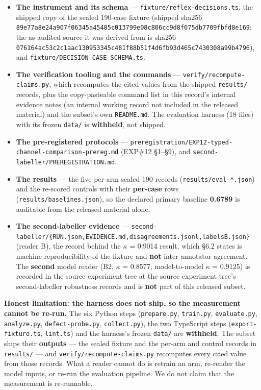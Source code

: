 \documentclass[11pt,a4paper]{article}
\begin{document}
\begin{itemize}
\item \textbf{The instrument and its schema} --- \texttt{fixture/reflex-decisions.ts}, the shipped copy of the sealed 190-case fixture (shipped sha256 \texttt{89e77a8e24a907f06345a45485c013799e08c806cc9d8f075db7709fbfd8e169}; the as-audited source it was derived from is sha256 \texttt{076164ac53c2c1aac130953345c481f88b51f4d6fb93d465c7430308a99b4796}), and \texttt{fixture/DECISION\_CASE\_SCHEMA.ts}.
\item \textbf{The verification tooling and the commands} --- \texttt{verify/recompute-claims.py}, which recomputes the cited values from the shipped \texttt{results/} records, plus the copy-pasteable command list in this record's internal evidence notes (an internal working record not included in the released material) and the subset's own \texttt{README.md}. The evaluation harness (18 files) with its frozen \texttt{data/} is \textbf{withheld}, not shipped.
\item \textbf{The pre-registered protocols} --- \texttt{preregistration/EXP12-typed-channel-comparison-prereg.md} (EXP\#12 \S1--\S9), and \texttt{second-labeller/PREREGISTRATION.md}.
\item \textbf{The results} --- the five per-arm sealed-190 records (\texttt{results/eval-*.json}) and the re-scored controls with their \textbf{per-case} rows (\texttt{results/baselines.json}), so the declared primary baseline \textbf{0.6789} is auditable from the released material alone.
\item \textbf{The second-labeller evidence} --- \texttt{second-labeller/\{RUN.json,EVIDENCE.md,disagreements.jsonl,labelsB.json\}} (reader B), the record behind the $\kappa$ = 0.9014 result, which \S6.2 states is machine reproducibility of the fixture and \textbf{not} inter-annotator agreement. The \textbf{second} model reader (B2, $\kappa$ = 0.8577; model-to-model $\kappa$ = 0.9125) is recorded in the source experiment tree at the source experiment tree's second-labeller robustness records and is \textbf{not} part of this released subset.
\end{itemize}

\textbf{Honest limitation: the harness does not ship, so the measurement cannot be re-run.} The six Python steps (\texttt{prepare.py}, \texttt{train.py}, \texttt{evaluate.py}, \texttt{analyze.py}, \texttt{defect-probe.py}, \texttt{collect.py}), the two TypeScript steps (\texttt{export-fixture.ts}, \texttt{lint.ts}) and the harness's frozen \texttt{data/} are \textbf{withheld}. The subset ships their \textbf{outputs} --- the sealed fixture and the per-arm and control records in \texttt{results/} --- and \texttt{verify/recompute-claims.py} recomputes every cited value from those records. What a reader cannot do is retrain an arm, re-render the model inputs, or re-run the evaluation pipeline. We do not claim that the measurement is re-runnable.
\end{document}
